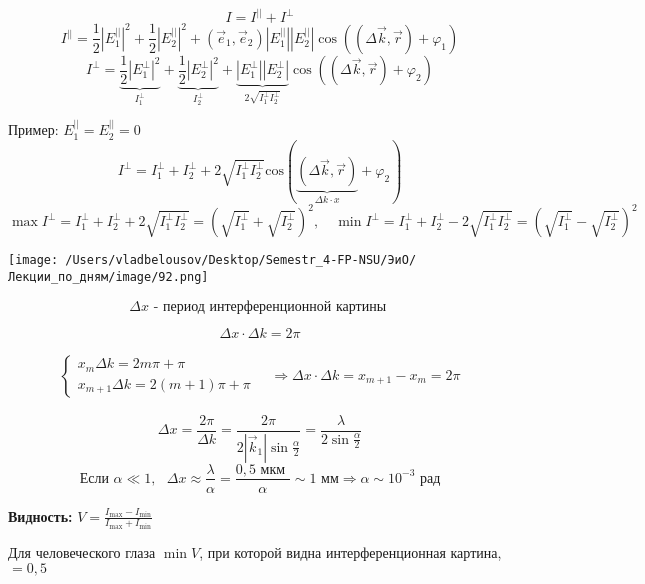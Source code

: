 \documentclass[12pt, a4paper]{report}
\begin{document}
\[ I = I^{ || }  + I ^{ \perp  }  \] 
\[ I ^{ ||    } = \frac{1}{2 }  |E_1 ^{ ||} |  ^2 + \frac{1}{2 }  |E_2 ^{||} | ^2  + (\vec{e } _1 ,\vec{e } _2 ) |E_1 ^{||} ||E_2 ^{ ||} | \cos  ((\Delta \vec{k } , \vec{r } )+ \varphi_1)  \] 
\[ I^{ \perp } = \underbrace{\frac{1}{2 }  |E_1 ^{ \perp} |  ^2 }_{I_1^{\perp } }+ \underbrace{\frac{1}{2 }  |E_2 ^{\perp} |  ^2}_{I_2^{\perp } } +\underbrace{ |E_1 ^{\perp} ||E_2 ^{ \perp} | }_{2 \sqrt{I_1 ^{\perp } I_2^{\perp }  }}\cos  ((\Delta \vec{k } , \vec{r } )+ \varphi_2)  \] 

Пример: \( E_1^{ ||} = E_2 ^{||}  =0    \) 
\[ I^{ \perp } = I_1^{\perp } + I_2 ^{\perp } +2\sqrt{I_1 ^{\perp } I_2 ^{\perp }   } \mathrm{cos}   (\underbrace{(\Delta \vec{k }  ,\vec{r } )}_{\Delta k \cdot x} + \varphi_2)   \] 
\[ \max  I^{\perp } = I_1 ^{\perp } + I_2 ^{\perp  } +2 \sqrt{I_1 ^{\perp }I_2 ^{\perp }  } = (\sqrt{ I_1^{\perp }} +\sqrt{I_2 ^{\perp } }  ) ^2 ,\quad  \min  I^{\perp } = I_1 ^{ \perp } + I_2 ^{\perp } - 2    \sqrt{I_1 ^{\perp }I_2 ^{\perp }  } = ( \sqrt{I_1^{\perp }} -\sqrt{I_2 ^{\perp }}   ) ^2    \] 


\begin{center}
    \texttt{[image: /Users/vladbelousov/Desktop/Semestr\_4-FP-NSU/ЭиО/Лекции\_по\_дням/image/92.png]}
\end{center} 
\[ \Delta x \text{ - период интерференционной картины }  \] 

\[ \Delta x \cdot \Delta k = 2 \pi  \] 

\[ \begin{aligned}
\begin{cases}
    x_m \Delta k = 2 m \pi + \pi    \\
    x_{m+1 }  \Delta k = 2 ( m+1 ) \pi + \pi
\end{cases}
\quad  \Rightarrow \Delta x \cdot \Delta k  = x_{m+1 }  - x_m = 2 \pi 
\end{aligned} \] 

\[ \Delta x = \frac{ 2\pi  }{\Delta k}  =\frac{2 \pi }{2 |\vec{k}_1 |\sin  \frac{\alpha}{2 }} = \frac{\lambda}{2 \sin  \frac{\alpha}{2 } }      \] 
\[ \text{Если } \alpha \ll 1 , \text{ } \Delta x \approx \frac{\lambda}{\alpha } = \frac{ 0, 5 \text{ мкм } }{\alpha } \sim 1 \text{ мм}   \Rightarrow \alpha \sim  10^{- 3 } \text{ рад}  \] 

\textbf{Видность: } \( \displaystyle  V = \frac{ I_{ \max  } - I_{ \min  }  }{ I_{ \max  } + I_{ \min }  }  \) 

Для человеческого глаза \( \min  V  \), при которой видна интерференционная картина, \( = 0,5 \) 
\end{document}
